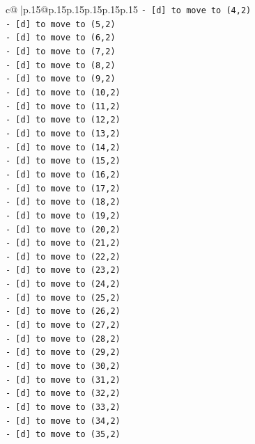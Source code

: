 \documentclass{article}
\begin{document}
{\begin{supertabular}{c@{$\;$}|p{.15\linewidth}@{}p{.15\linewidth}p{.15\linewidth}p{.15\linewidth}p{.15\linewidth}p{.15\linewidth}}
{{{\texttt{{-} {[}d{]} to move to (4,2)} \\
\texttt{{-} {[}d{]} to move to (5,2)} \\
\texttt{{-} {[}d{]} to move to (6,2)} \\
\texttt{{-} {[}d{]} to move to (7,2)} \\
\texttt{{-} {[}d{]} to move to (8,2)} \\
\texttt{{-} {[}d{]} to move to (9,2)} \\
\texttt{{-} {[}d{]} to move to (10,2)} \\
\texttt{{-} {[}d{]} to move to (11,2)} \\
\texttt{{-} {[}d{]} to move to (12,2)} \\
\texttt{{-} {[}d{]} to move to (13,2)} \\
\texttt{{-} {[}d{]} to move to (14,2)} \\
\texttt{{-} {[}d{]} to move to (15,2)} \\
\texttt{{-} {[}d{]} to move to (16,2)} \\
\texttt{{-} {[}d{]} to move to (17,2)} \\
\texttt{{-} {[}d{]} to move to (18,2)} \\
\texttt{{-} {[}d{]} to move to (19,2)} \\
\texttt{{-} {[}d{]} to move to (20,2)} \\
\texttt{{-} {[}d{]} to move to (21,2)} \\
\texttt{{-} {[}d{]} to move to (22,2)} \\
\texttt{{-} {[}d{]} to move to (23,2)} \\
\texttt{{-} {[}d{]} to move to (24,2)} \\
\texttt{{-} {[}d{]} to move to (25,2)} \\
\texttt{{-} {[}d{]} to move to (26,2)} \\
\texttt{{-} {[}d{]} to move to (27,2)} \\
\texttt{{-} {[}d{]} to move to (28,2)} \\
\texttt{{-} {[}d{]} to move to (29,2)} \\
\texttt{{-} {[}d{]} to move to (30,2)} \\
\texttt{{-} {[}d{]} to move to (31,2)} \\
\texttt{{-} {[}d{]} to move to (32,2)} \\
\texttt{{-} {[}d{]} to move to (33,2)} \\
\texttt{{-} {[}d{]} to move to (34,2)} \\
\texttt{{-} {[}d{]} to move to (35,2)} \\
}}}
\end{supertabular}}
\end{document}
